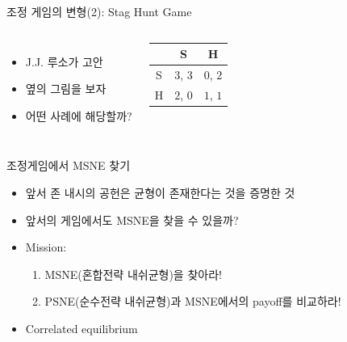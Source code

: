 \documentclass[final]{beamer}
\begin{document}
\begin{frame}[t]{조정 게임의 변형(2): Stag Hunt Game}
	\begin{columns}[c]
	\column{13em}
	\begin{itemize}
		\item J.J. 루소가 고안  
		\item 옆의 그림을 보자 
		\item 어떤 사례에 해당할까? 
	\end{itemize}
	\column{16em}
	\hspace{-1em}
	\begin{center}
	\begin{table}
	\setlength{\tabcolsep}{1.2em}
	\begin{tabular}{|c|c|c|} \hline
	& {S} &  {H} \\ \hline
	{S} & {$3$}, {$3$} & {$0$}, {$2$} \\ \hline%
	{H} & {$2$}, {$0$}  & {$1$}, {$1$} \\ 
	\hline
	\end{tabular}
	\end{table}
	\end{center}
	\end{columns}
\end{frame}

\begin{frame}[t]{조정게임에서 MSNE 찾기}
	\begin{itemize}
		\item 앞서 존 내시의 공헌은 균형이 존재한다는 것을 증명한 것
		\item 앞서의 게임에서도 MSNE을 찾을 수 있을까?
		\item Mission:
			\begin{enumerate}
			\item MSNE(혼합전략 내쉬균형)을 찾아라!
			\item PSNE(순수전략 내쉬균형)과 MSNE에서의 payoff를 비교하라!	
			\end{enumerate}
		\item Correlated equilibrium	
	\end{itemize}
\end{frame}
\end{document}
